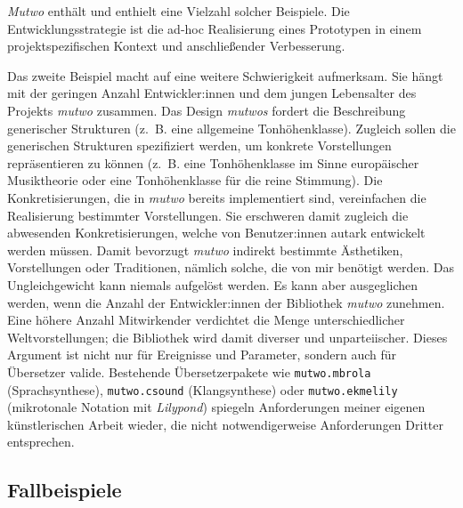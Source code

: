 \documentclass[12pt,a4paper,ngerman]{article}
\begin{document}
\smallskip

\emph{Mutwo} enthält und enthielt eine Vielzahl solcher Beispiele.
Die Entwicklungsstrategie ist die ad-hoc Realisierung eines Prototypen in einem projektspezifischen Kontext und anschließender Verbesserung.

\bigskip

Das zweite Beispiel macht auf eine weitere Schwierigkeit aufmerksam.
Sie hängt mit der geringen Anzahl Entwickler:innen und dem jungen Lebensalter des Projekts \emph{mutwo} zusammen.
Das Design \emph{mutwos} fordert die Beschreibung generischer Strukturen (z.~B. eine allgemeine Tonhöhenklasse).
Zugleich sollen die generischen Strukturen spezifiziert werden, um konkrete Vorstellungen repräsentieren zu können (z.~B. eine Tonhöhenklasse im Sinne europäischer Musiktheorie oder eine Tonhöhenklasse für die reine Stimmung).
Die Konkretisierungen, die in \emph{mutwo} bereits implementiert sind, vereinfachen die Realisierung bestimmter Vorstellungen.
Sie erschweren damit zugleich die abwesenden Konkretisierungen, welche von Benutzer:innen autark entwickelt werden müssen.
Damit bevorzugt \emph{mutwo} indirekt bestimmte Ästhetiken, Vorstellungen oder Traditionen, nämlich solche, die von mir benötigt werden.
Das Ungleichgewicht kann niemals aufgelöst werden.
Es kann aber ausgeglichen werden, wenn die Anzahl der Entwickler:innen der Bibliothek \emph{mutwo} zunehmen.
Eine höhere Anzahl Mitwirkender verdichtet die Menge unterschiedlicher Weltvorstellungen; die Bibliothek wird damit diverser und unparteiischer.
Dieses Argument ist nicht nur für Ereignisse und Parameter, sondern auch für Übersetzer valide.
Bestehende Übersetzerpakete wie \texttt{mutwo.mbrola} (Sprachsynthese), \texttt{mutwo.csound} (Klangsynthese) oder \texttt{mutwo.ekmelily} (mikrotonale Notation mit \emph{Lilypond}) spiegeln Anforderungen meiner eigenen künstlerischen Arbeit wieder, die nicht notwendigerweise Anforderungen Dritter entsprechen.


%



\subsection{Fallbeispiele}
\end{document}

